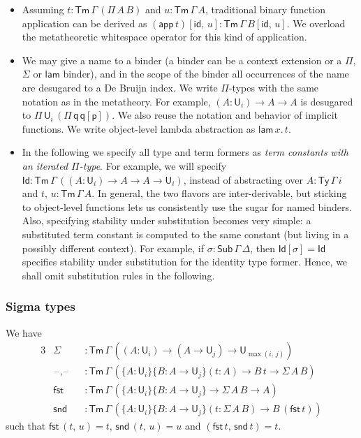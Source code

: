 \documentclass[acmsmall,screen,review,anonymous]{acmart}
\newcommand{\msf}[1]{{\mathsf{#1}}}
\newcommand{\p}{\mathsf{p}}
\newcommand{\q}{\mathsf{q}}
\newcommand{\U}{\msf{U}}
\newcommand{\blank}{{\mathord{\hspace{1pt}\text{--}\hspace{1pt}}}}
\newcommand{\fst}{\msf{fst}}
\newcommand{\snd}{\msf{snd}}
\newcommand{\id}{\msf{id}}
\newcommand{\Sub}{\msf{Sub}}
\newcommand{\Ty}{\msf{Ty}}
\newcommand{\Tm}{\msf{Tm}}
\newcommand{\lam}{\msf{lam}}
\newcommand{\app}{\msf{app}}
\newcommand{\Id}{\msf{Id}}
\begin{document}
\begin{itemize}
\item Assuming $t : \Tm\,\Gamma\,(\Pi\,A\,B)$ and $u : \Tm\,\Gamma\,A$, traditional binary function
  application can be derived as $(\app\,t)[\id,\,u] : \Tm\,\Gamma\,B[\id,\,u]$. We overload the
  metatheoretic whitespace operator for this kind of application.
\item We may give a name to a binder (a binder can be a context extension or a $\Pi$, $\Sigma$ or
  $\lam$ binder), and in the scope of the binder all occurrences of the name are desugared to a De
  Bruijn index. We write $\Pi$-types with the same notation as in the metatheory. For example, $(A
  : \U_i) \to A \to A$ is desugared to $\Pi\,\U_i\,(\Pi\,\q\,\q[\p])$. We also reuse the notation
  and behavior of implicit functions. We write object-level lambda abstraction as $\lam\,x.\,t$.
\item
  In the following we specify all type and term formers as \emph{term constants with an iterated
  $\Pi$-type}. For example, we will specify $\Id : \Tm\,\Gamma\,((A : \U_i) \to A \to A \to \U_i)$,
  instead of abstracting over $A : \Ty\,\Gamma\,i$ and $t,\,u : \Tm\,\Gamma\,A$. In general, the two
  flavors are inter-derivable, but sticking to object-level functions lets us consistently use the
  sugar for named binders. Also, specifying stability under substitution becomes very simple: a
  substituted term constant is computed to the same constant (but living in a possibly different
  context). For example, if $\sigma : \Sub\,\Gamma\,\Delta$, then $\Id[\sigma] = \Id$ specifies
  stability under substitution for the identity type former. Hence, we shall omit substitution rules
  in the following.
\end{itemize}

\subsubsection{Sigma types} We have
\begin{alignat*}{3}
  &\Sigma        &&: \Tm\,\Gamma\,((A : \U_i) \to (A \to \U_j) \to \U_{\max(i,\,j)}) \\
  &\blank,\blank &&: \Tm\,\Gamma\,(\{A : \U_i\}\{B : A \to \U_j\}(t : A) \to B\,t \to \Sigma\,A\,B)\\
  &\fst          &&: \Tm\,\Gamma\,(\{A : \U_i\}\{B : A \to \U_j\} \to \Sigma\,A\,B \to A)\\
  &\snd          &&: \Tm\,\Gamma\,(\{A : \U_i\}\{B : A \to \U_j\}(t : \Sigma\,A\,B) \to B\,(\fst\,t))
\end{alignat*}
such that $\fst\,(t,\,u) = t$, $\snd\,(t,\,u) = u$ and $(\fst\,t,\,\snd\,t) = t$.
\end{document}
